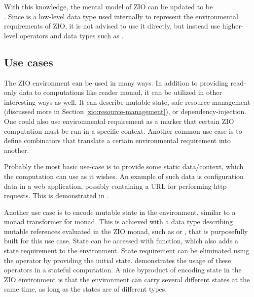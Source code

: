 

With this knowledge, the mental model of ZIO can be updated to be \\. Since  is a low-level data type used internally to represent the environmental requirements of ZIO, it is not advised to use it directly, but instead use higher-level operators and data types such as .


\subsection{Use cases}
The ZIO environment can be used in many ways. In addition to providing read-only data to computations like reader monad, it can be utilized in other interesting ways as well. It can describe mutable state, safe resource management (discussed more in Section \ref{zio:resource-management}), or dependency-injection. One could also use environmental requirement as a marker that certain ZIO computation must be run in a specific context. Another common use-case is to define combinators that translate a certain environmental requirement into another.

Probably the most basic use-case is to provide some static data/context, which the computation can use as it wishes. An example of such data is configuration data in a web application, possibly containing a URL for performing http requests. This is demonstrated in .



Another use case is to encode mutable state in the environment, similar to a monad transformer for  monad. This is achieved with a data type describing mutable references evaluated in the ZIO monad, such as  or , that is purposefully built for this use case. State can be accessed with  function, which also adds a state requirement to the environment. State requirement can be eliminated using the  operator by providing the initial state.  demonstrates the usage of these operators in a stateful computation. A nice byproduct of encoding state in the ZIO environment is that the environment can carry several different states at the same time, as long as the states are of different types.



